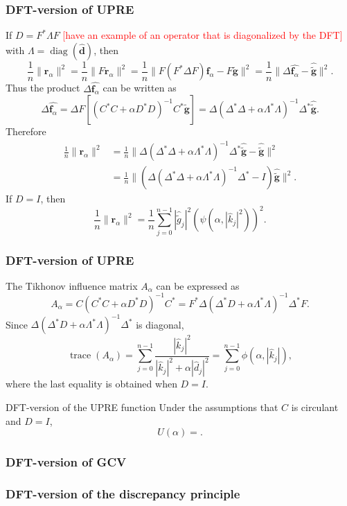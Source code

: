 \documentclass{beamer}
\newcommand{\ToDo}[1]{\textcolor{red}{[#1]}}
\newcommand{\gnoise}{\widetilde{g}}	%
\newcommand{\gnoiseVec}{\widetilde{\mathbf{g}}}	%
\newcommand{\fVec}{\mathbf{f}}	%
\newcommand{\dVec}{\mathbf{d}}	%
\newcommand{\ctrans}{*}	%
\DeclareMathOperator{\diag}{diag}	%
\DeclareMathOperator{\trace}{trace}		%
\newcommand{\regparam}{\alpha}
\newcommand{\regf}{\fVec_{\regparam}}	%
\newcommand{\filt}{\phi}
\newcommand{\mfilt}{\psi}
\newcommand{\regres}{\mathbf{r}_{\regparam}}	%
\newcommand{\A}{A_{\regparam}}	%
\newcommand{\U}{U}	%
\begin{document}
\begin{frame}
\frametitle{DFT-version of UPRE}
If $D = F^\ctrans\Lambda{F}$ \ToDo{have an example of an operator that is diagonalized by the DFT} with $\Lambda = \diag(\widehat{\dVec})$, then
\[\frac{1}{n}\|\regres\|^2 = \frac{1}{n}\|F\regres\|^2 = \frac{1}{n}\|F(F^\ctrans\Delta{F})\regf - F\gnoiseVec\|^2 = \frac{1}{n}\|\Delta\widehat{\regf} - \widehat{\gnoiseVec}\|^2.\]
Thus the product $\Delta\widehat{\regf}$ can be written as
\[\Delta\widehat{\regf} = \Delta{F}[(C^\ctrans{C} + \regparam{D^\ctrans}D)^{-1}C^\ctrans\gnoiseVec] = \Delta(\Delta^\ctrans{\Delta} + \regparam\Lambda^\ctrans{\Lambda})^{-1}\Delta^\ctrans\widehat{\gnoiseVec}.\]
Therefore
\begin{align*}
\frac{1}{n}\|\regres\|^2 &= \frac{1}{n}\|\Delta(\Delta^\ctrans{\Delta} + \regparam\Lambda^\ctrans{\Lambda})^{-1}\Delta^\ctrans\widehat{\gnoiseVec} - \widehat{\gnoiseVec}\|^2 \\
&= \frac{1}{n}\|(\Delta(\Delta^\ctrans{\Delta} + \regparam\Lambda^\ctrans{\Lambda})^{-1}\Delta^\ctrans - I)\widehat{\gnoiseVec}\|^2.
\end{align*}
If $D = I$, then
\[\frac{1}{n}\|\regres\|^2 = \frac{1}{n}\sum_{j=0}^{n-1}|\widehat{\gnoise}_j|^2\left(\mfilt(\regparam,|\widehat{k}_j|^2)\right)^2.\]
\end{frame}

\begin{frame}
\frametitle{DFT-version of UPRE}
The Tikhonov influence matrix $\A$ can be expressed as
\[\A = C(C^\ctrans{C} + \regparam{D^\ctrans}D)^{-1}C^\ctrans = F^\ctrans\Delta(\Delta^\ctrans{D} + \regparam\Lambda^\ctrans{\Lambda})^{-1}\Delta^\ctrans{F}.\]
Since $\Delta(\Delta^\ctrans{D} + \regparam\Lambda^\ctrans{\Lambda})^{-1}\Delta^\ctrans$ is diagonal,
\[\trace(\A) = \sum_{j = 0}^{n-1} \frac{|\widehat{k}_j|^2}{|\widehat{k}_j|^2 + \regparam|\widehat{d}_j|^2} = \sum_{j = 0}^{n-1} \filt(\regparam,|\widehat{k}_j|),\]
where the last equality is obtained when $D = I$.
\begin{block}{DFT-version of the UPRE function}
Under the assumptions that $C$ is circulant and $D = I$,
\[\U(\regparam) = .\]
\end{block}
\end{frame}

\begin{frame}
\frametitle{DFT-version of GCV}

\end{frame}

\begin{frame}
\frametitle{DFT-version of the discrepancy principle}

\end{frame}
\end{document}

